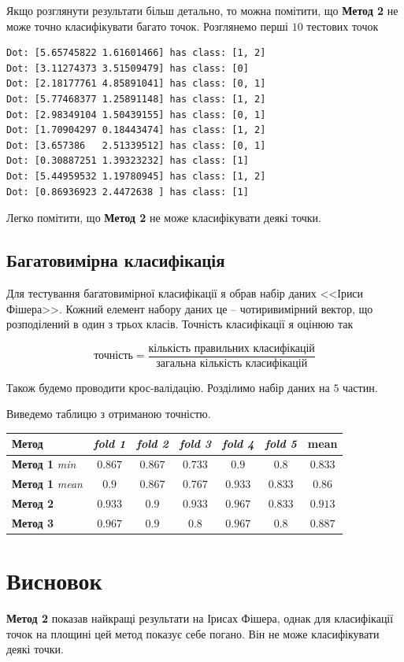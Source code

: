 \documentclass[a4paper,12pt]{article}
\begin{document}
Якщо розглянути результати більш детально, то можна помітити, що \textbf{Метод 2} не може точно класифікувати багато точок. Розглянемо перші $10$ тестових точок

\begin{verbatim}
Dot: [5.65745822 1.61601466] has class: [1, 2]
Dot: [3.11274373 3.51509479] has class: [0]
Dot: [2.18177761 4.85891041] has class: [0, 1]
Dot: [5.77468377 1.25891148] has class: [1, 2]
Dot: [2.98349104 1.50439155] has class: [0, 1]
Dot: [1.70904297 0.18443474] has class: [1, 2]
Dot: [3.657386   2.51339512] has class: [0, 1]
Dot: [0.30887251 1.39323232] has class: [1]
Dot: [5.44959532 1.19780945] has class: [1, 2]
Dot: [0.86936923 2.4472638 ] has class: [1]
\end{verbatim}

Легко помітити, що \textbf{Метод 2} не може класифікувати деякі точки.

\subsection{Багатовимірна класифікація}

Для тестування багатовимірної класифікації я обрав набір даних <<Іриси Фішера>>. Кожний елемент набору даних це -- чотиривимірний вектор, що розподілений в один з трьох класів. Точність класифікації я оцінюю так

\begin{displaymath}
	\text{точність}=\frac{\text{кількість правильних класифікацій}}{\text{загальна кількість класифікацій}}
\end{displaymath}

Також будемо проводити крос-валідацію. Розділимо набір даних на $5$ частин. 

Виведемо таблицю з отриманою точністю. 

\begin{tabular}{| l | c | c | c | c | c | c |}
	\hline
	Метод & \textit{fold 1} & \textit{fold 2} & \textit{fold 3} & \textit{fold 4} & \textit{fold 5} & mean \\
	\hline
	
	\textbf{Метод 1} \textit{min} & $0.867$&  $0.867$& $0.733$ & $0.9$ &  $0.8$& $0.833$ \\
	
	\textbf{Метод 1} \textit{mean} & $0.9$ & $0.867$ & 
	$0.767$ & $0.933$ & $0.833$ & $0.86$ \\
	
	\textbf{Метод 2} & $0.933$ & $0.9$ & $0.933$ & $0.967$ & $0.833$ & $0.913$ \\
	\textbf{Метод 3} & $0.967$& $0.9$ &$0.8$ & $0.967$& $0.8$ & $0.887$\\
	\hline
\end{tabular}

\section{Висновок}
	\textbf{Метод 2} показав найкращі результати на Ірисах Фішера, однак для класифікації точок на площині цей метод показує себе погано. Він не може класифікувати деякі точки.
\end{document}
